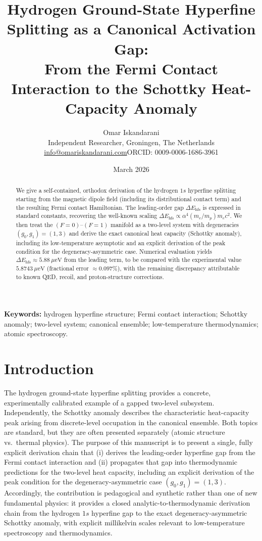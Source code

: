 \documentclass[11pt,a4paper]{article}
\title{\textbf{Hydrogen Ground-State Hyperfine Splitting as a Canonical Activation Gap:\\
From the Fermi Contact Interaction to the Schottky Heat-Capacity Anomaly}}
\author{Omar Iskandarani\\
\small Independent Researcher, Groningen, The Netherlands\\
\small \href{mailto:info@omariskandarani.com}{info@omariskandarani.com}\quad ORCID: 0009-0006-1686-3961}
\date{March 2026}
\begin{document}
    \maketitle
    
    \begin{abstract}
        We give a self-contained, orthodox derivation of the hydrogen $1s$ hyperfine splitting starting from the magnetic dipole field (including its distributional contact term) and the resulting Fermi contact Hamiltonian. The leading-order gap $\Delta E_{\mathrm{hfs}}$ is expressed in standard constants, recovering the well-known scaling $\Delta E_{\mathrm{hfs}}\propto \alpha^4(m_e/m_p)m_ec^2$. We then treat the $(F=0)$--$(F=1)$ manifold as a two-level system with degeneracies $(g_0,g_1)=(1,3)$ and derive the exact canonical heat capacity (Schottky anomaly), including its low-temperature asymptotic and an explicit derivation of the peak condition for the degeneracy-asymmetric case. Numerical evaluation yields $\Delta E_{\mathrm{hfs}}\approx 5.88~\mu\mathrm{eV}$ from the leading term, to be compared with the experimental value $5.8743~\mu\mathrm{eV}$ (fractional error $\approx 0.097\%$), with the remaining discrepancy attributable to known QED, recoil, and proton-structure corrections.
    \end{abstract}
    
    \vspace{0.5cm}
    \noindent\textbf{Keywords:} hydrogen hyperfine structure; Fermi contact interaction; Schottky anomaly; two-level system; canonical ensemble; low-temperature thermodynamics; atomic spectroscopy.
    \vspace{0.5cm}

    \section{Introduction}
        \label{sec:intro}
        
        The hydrogen ground-state hyperfine splitting provides a concrete, experimentally calibrated example of a gapped two-level subsystem.
        Independently, the Schottky anomaly describes the characteristic heat-capacity peak arising from discrete-level occupation in the canonical ensemble.
        Both topics are standard, but they are often presented separately (atomic structure vs.\ thermal physics).
        The purpose of this manuscript is to present a single, fully explicit derivation chain that (i) derives the leading-order hyperfine gap from the Fermi contact interaction and (ii) propagates that gap into thermodynamic predictions for the two-level heat capacity, including an explicit derivation of the peak condition for the degeneracy-asymmetric case $(g_0,g_1)=(1,3)$.
        Accordingly, the contribution is pedagogical and synthetic rather than one of new fundamental physics:
        it provides a closed analytic-to-thermodynamic derivation chain from the hydrogen $1s$ hyperfine gap
        to the exact degeneracy-asymmetric Schottky anomaly, with explicit millikelvin scales relevant to low-temperature spectroscopy and thermodynamics.
\end{document}
